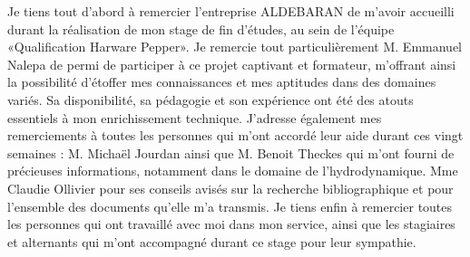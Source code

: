 Je tiens tout d’abord à remercier l’entreprise ALDEBARAN de m’avoir accueilli durant la réalisation de mon stage de fin d'études, au sein de l'équipe «Qualification Harware Pepper».
Je remercie tout particulièrement M. Emmanuel Nalepa de permi de participer à ce projet captivant et formateur, m’offrant ainsi la possibilité d'étoffer mes connaissances et mes aptitudes dans des domaines variés. Sa disponibilité, sa pédagogie et son expérience ont été des atouts essentiels à mon enrichissement technique.
J’adresse également mes remerciements à toutes les personnes qui m’ont accordé leur aide durant ces vingt semaines :
M. Michaël Jourdan ainsi que M. Benoit Theckes qui m’ont fourni de précieuses informations, notamment dans le domaine de l’hydrodynamique.
Mme Claudie Ollivier pour ses conseils avisés sur la recherche bibliographique et pour l’ensemble des documents qu’elle m’a transmis.
Je tiens enfin à remercier toutes les personnes qui ont travaillé avec moi dans mon service, ainsi que les stagiaires et alternants qui m’ont accompagné durant ce stage pour leur sympathie.